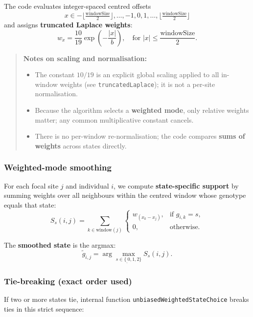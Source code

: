 \documentclass[
]{book}
\providecommand{\tightlist}{%
  \setlength{\itemsep}{0pt}\setlength{\parskip}{0pt}}
\begin{document}
The code evaluates integer-spaced centred offsets
\[
x \in {-\lfloor \tfrac{\text{windowSize}}{2}\rfloor,\ldots, -1,0,1,\ldots,\lfloor \tfrac{\text{windowSize}}{2}\rfloor}
\]
and assigns \textbf{truncated Laplace weights}:
\[
w_x = \frac{10}{19} \exp\left(-\frac{|x|}{b}\right),\quad \text{for } |x| \le \frac{\text{windowSize}}{2}.
\]

\begin{quote}
\textbf{Notes on scaling and normalisation:}

\begin{itemize}
\tightlist
\item
  The constant \(10/19\) is an explicit global scaling applied to all in-window weights (see \texttt{truncatedLaplace}); it is not a per-site normalisation.
\item
  Because the algorithm selects a \textbf{weighted mode}, only relative weights matter; any common multiplicative constant cancels.
\item
  There is no per-window re-normalisation; the code compares \textbf{sums of weights} across states directly.
\end{itemize}
\end{quote}

\subsubsection{Weighted-mode smoothing}\label{weighted-mode-smoothing}

For each focal site \(j\) and individual \(i\), we compute \textbf{state-specific support} by summing weights over all neighbours within the centred window whose genotype equals that state:
\[
S_s(i,j) = \sum_{k \in \text{window}(j)}
  \begin{cases}
    w_{(x_k - x_j)}, & \text{if } g_{i,k} = s, \\
    0, & \text{otherwise.}
  \end{cases}
\]

The \textbf{smoothed state} is the argmax:
\[
\tilde g_{i,j} = \arg\max_{s\in \{_,0,1,2\}} S_s(i,j).
\]

\subsubsection{Tie-breaking (exact order used)}\label{tie-breaking-exact-order-used}

If two or more states tie, internal function \texttt{unbiasedWeightedStateChoice} breaks ties in this strict sequence:
\end{document}

